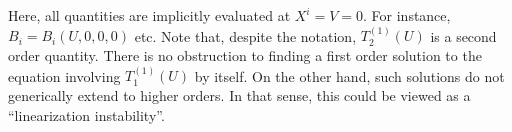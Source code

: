 	Here, all quantities are implicitly evaluated at $X^i = V = 0$. For instance, $B_i = B_i(U,0,0,0)$ etc. Note that, despite the notation, $T_{2}^{(1)}(U)$ is a second order quantity. There is no obstruction to finding a first order solution to the equation involving $T_{1}^{(1)}(U)$ by itself. On the other hand, such solutions do not generically extend to higher orders. In that sense, this could be viewed as a ``linearization instability''.

